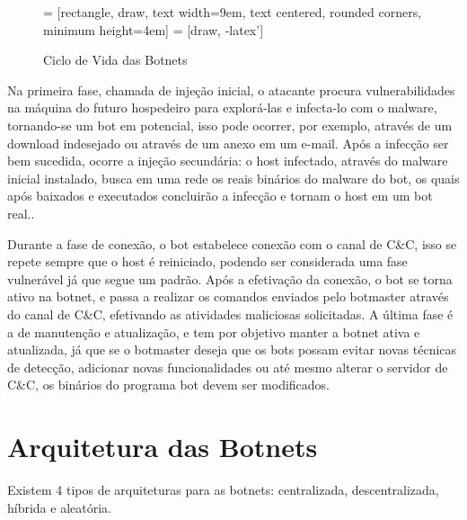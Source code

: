 \begin{figure}
 = [rectangle, draw, text width=9em, text centered, rounded corners, minimum height=4em]
 = [draw, -latex']
\centering
{}
\caption[Ciclo de Vida das Botnets]{Ciclo de Vida das Botnets} \label{fig:botnets_lifecycle}
\end{figure}

Na primeira fase, chamada de injeção inicial, o atacante procura vulnerabilidades na máquina do futuro hospedeiro para explorá-las e infecta-lo com o malware, tornando-se um bot em potencial, isso pode ocorrer, por exemplo, através de um download indesejado ou através de um anexo em um e-mail. Após a infecção ser bem sucedida, ocorre a injeção secundária: o host infectado, através do malware inicial instalado, busca em uma rede os reais binários do malware do bot, os quais após baixados e executados concluirão a infecção e tornam o host em um bot real.\cite{feily2009survey}.

Durante a fase de conexão, o bot estabelece conexão com o canal de C\&C, isso se repete sempre que o host é reiniciado, podendo ser considerada uma fase vulnerável já que segue um padrão. Após a efetivação da conexão, o bot se torna ativo na botnet, e passa a realizar os comandos enviados pelo botmaster através do canal de C\&C, efetivando as atividades maliciosas solicitadas. A última fase é a de manutenção e atualização, e tem por objetivo manter a botnet ativa e atualizada, já que se o botmaster deseja que os bots possam evitar novas técnicas de detecção, adicionar novas funcionalidades ou até mesmo alterar o servidor de C\&C, os binários do programa bot devem ser modificados.

\section{Arquitetura das Botnets}
Existem 4 tipos de arquiteturas para as botnets: centralizada, descentralizada, híbrida e aleatória. 

